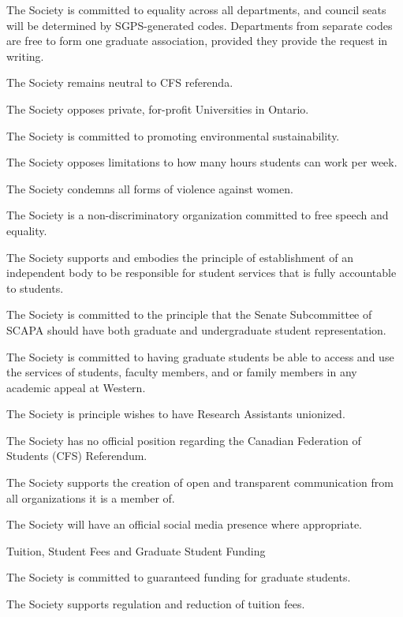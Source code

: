 \begin{longenum}[label*=\thesection.\arabic*., align=left]
\begin{longenum}[label*=\arabic*., align=left]
\begin{longenum}[label*=\arabic*., align=left]
\item The Society is committed to equality across all departments, and council seats will be determined by SGPS-generated codes. Departments from separate codes are free to form one graduate association, provided they provide the request in writing.
\item The Society remains neutral to CFS referenda.
\item The Society opposes private, for-profit Universities in Ontario.
\item The Society is committed to promoting environmental sustainability.
\item The Society opposes limitations to how many hours students can work per week.
\item The Society condemns all forms of violence against women.
\item The Society is a non-discriminatory organization committed to free speech and equality.
\item The Society supports and embodies the principle of establishment of an independent body to be responsible for student services that is fully accountable to students.
\item The Society is committed to the principle that the Senate Subcommittee of SCAPA should have both graduate and undergraduate student representation.
\item The Society is committed to having graduate students be able to access and use the services of students, faculty members, and or family members in any academic appeal at Western.
\item The Society is principle wishes to have Research Assistants unionized.
\item The Society has no official position regarding the Canadian Federation of Students (CFS) Referendum.
\item The Society supports the creation of open and transparent communication from all organizations it is a member of.
\item The Society will have an official social media presence where appropriate.
\end{longenum}
\item Tuition, Student Fees and Graduate Student Funding
\begin{longenum}[label*=\arabic*., align=left]
\item The Society is committed to guaranteed funding for graduate students.
\item The Society supports regulation and reduction of tuition fees.

\end{longenum}
\end{longenum}
\end{longenum}
